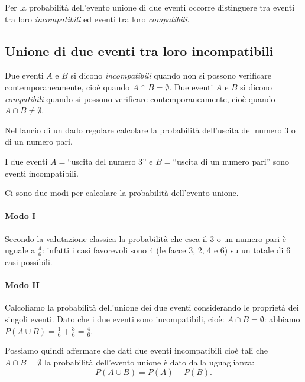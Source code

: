 Per la probabilità dell'evento unione di due eventi occorre distinguere tra eventi tra loro \emph{incompatibili} ed eventi tra loro \emph{compatibili}.

\subsection[Unione di due eventi tra loro incompatibili]{Unione di due eventi tra loro incompatibili}

\begin{definizione}
Due eventi $A$ e $B$ si dicono \emph{incompatibili} quando non si possono verificare contemporaneamente, cioè quando $A\cap B=\emptyset$. Due eventi $A$ e $B$ si dicono \emph{compatibili} quando si possono verificare contemporaneamente, cioè quando $A\cap B\neq \emptyset$.
\end{definizione}

\begin{exrig}
\begin{esempio}
Nel lancio di un dado regolare calcolare la probabilità dell'uscita del numero 3 o di un numero pari.

I due eventi $A=$``uscita del numero 3'' e $B=$``uscita di un numero pari'' sono eventi incompatibili.

Ci sono due modi per calcolare la probabilità dell'evento unione.
\paragraph{Modo I} Secondo la valutazione classica la probabilità che esca il $3$ o un numero pari è uguale a $\frac 4 6$: infatti i casi favorevoli sono 4 (le facce 3, 2, 4 e 6) su un totale di $6$ casi possibili.
\paragraph{Modo II} Calcoliamo la probabilità dell'unione dei due eventi considerando le proprietà dei singoli eventi. Dato che i due eventi sono incompatibili, cioè: $A\cap B=\emptyset $: abbiamo $P(A\cup B)=\frac 1 6+\frac 3 6=\frac 4 6$.
\begin{center}
 
\end{center}
\end{esempio}
\end{exrig}

Possiamo quindi affermare che dati due eventi incompatibili cioè tali che $A\cap B=\emptyset$ la probabilità dell'evento unione è dato dalla uguaglianza: \[P(A\cup B)=P(A)+P(B).\]

